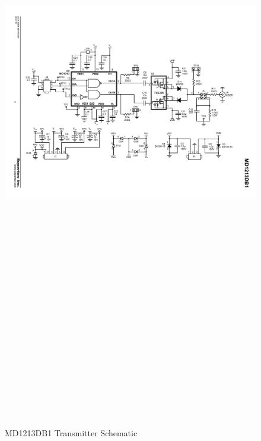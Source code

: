 \begin{landscape}
	\begin{figure}[htbp]
		\centering
		\includegraphics[width=20cm,height=28.7cm,keepaspectratio]{Figures/appendix/md1213db1_final.pdf}
		\caption{MD1213DB1 Transmitter Schematic}
		\label{fig:appendix_md1213db1}
	\end{figure}
\end{landscape}
